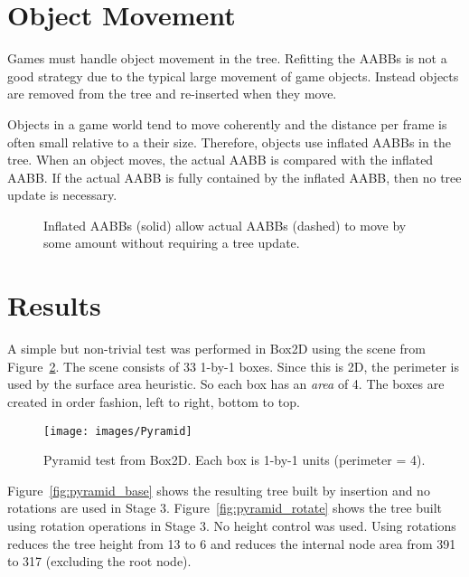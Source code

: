 \documentclass{article}
\begin{document}
\section{Object Movement}

Games must handle object movement in the tree. Refitting the AABBs is not a good strategy due to the typical large movement of game objects. Instead objects are removed from the tree and re-inserted when they move. 

Objects in a game world tend to move coherently and the distance per frame is often small relative to a their size. Therefore, objects use inflated AABBs in the tree. When an object moves, the actual AABB is compared with the inflated AABB. If the actual AABB is fully contained by the inflated AABB, then no tree update is necessary.

\begin{figure}
	\begin{center}
		
	\end{center}
	\caption{Inflated AABBs (solid) allow actual AABBs (dashed) to move by some amount without requiring a tree update. }
	\label{fig:inflated}
\end{figure}

\section{Results}

A simple but non-trivial test was performed in Box2D using the scene from Figure~\ref{fig:pyramid}. The scene consists of 33 1-by-1 boxes. Since this is 2D, the perimeter is used by the surface area heuristic. So each box has an \emph{area} of 4. The boxes are created in order fashion, left to right, bottom to top.

\begin{figure}
	\begin{center}
		\texttt{[image: images/Pyramid]}
	\end{center}
	\caption{ Pyramid test from Box2D. Each box is 1-by-1 units (perimeter = 4).}
	\label{fig:pyramid}
\end{figure}

Figure~\ref{fig:pyramid_base} shows the resulting tree built by insertion and no rotations are used in Stage 3. Figure~\ref{fig:pyramid_rotate} shows the tree built using rotation operations in Stage 3. No height control was used. Using rotations reduces the tree height from 13 to 6 and reduces the internal node area from 391 to 317 (excluding the root node).
\end{document}
